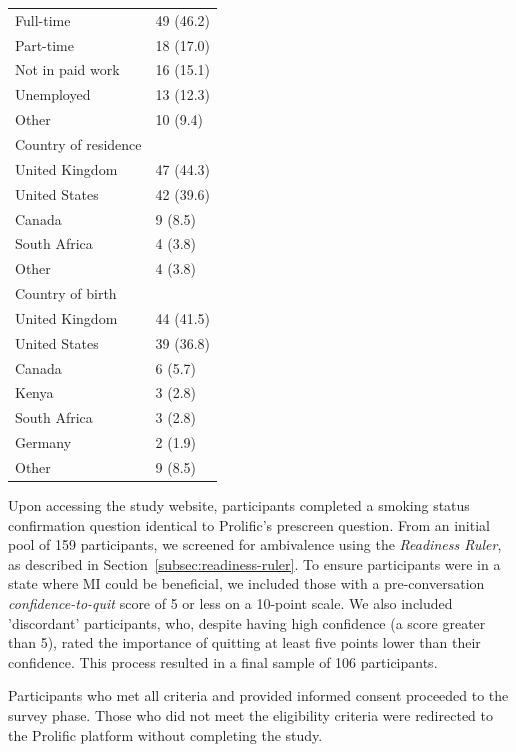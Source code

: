 \begin{table}[htbp]
\begin{tabular}{l l}
\quad Full-time & 49 (46.2) \\
\quad Part-time & 18 (17.0) \\
\quad Not in paid work & 16 (15.1) \\
\quad Unemployed & 13 (12.3) \\
\quad Other & 10 (9.4) \\
\hline
Country of residence & \\
\quad United Kingdom & 47 (44.3) \\
\quad United States & 42 (39.6) \\
\quad Canada & 9 (8.5) \\
\quad South Africa & 4 (3.8) \\
\quad Other & 4 (3.8) \\
\hline
Country of birth & \\
\quad United Kingdom & 44 (41.5) \\
\quad United States & 39 (36.8) \\
\quad Canada & 6 (5.7) \\
\quad Kenya & 3 (2.8) \\
\quad South Africa & 3 (2.8) \\
\quad Germany & 2 (1.9) \\
\quad Other & 9 (8.5) \\
\hline
\end{tabular}
\label{tab:participant-characteristics}
\end{table}


Upon accessing the study website, participants completed a smoking status confirmation question identical to Prolific's prescreen question. From an initial pool of 159 participants, we screened for ambivalence using the \textit{Readiness Ruler}, as described in Section~\ref{subsec:readiness-ruler}. To ensure participants were in a state where MI could be beneficial, we included those with a pre-conversation \emph{confidence-to-quit} score of 5 or less on a 10-point scale. We also included 'discordant'
participants, who, despite having high confidence (a score greater than 5), rated the importance of quitting at least five points lower than their confidence. This process resulted in a final sample of 106 participants.


Participants who met all criteria and provided informed consent proceeded to the survey phase. Those who did not meet the eligibility criteria were redirected to the Prolific platform without completing the study.

